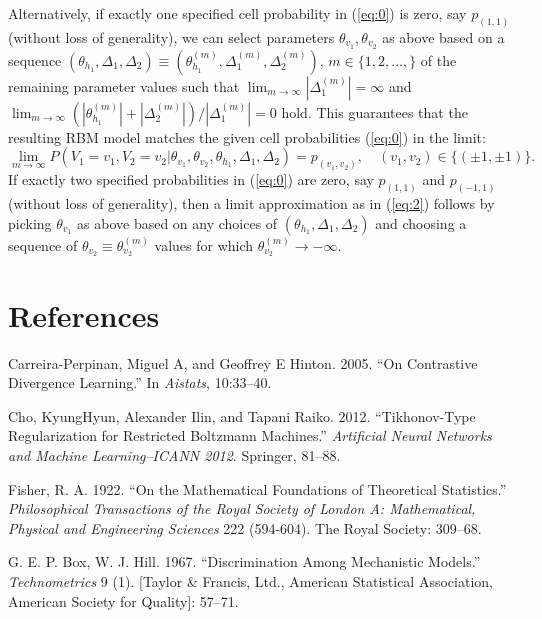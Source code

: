 \documentclass[12pt]{article}
\theoremstyle{definition}
\begin{document}
Alternatively, if exactly one specified cell probability in (\eqref{eq:0})
is zero, say \(p_{(1,1)}\) (without loss of generality), we can select
parameters \(\theta_{v_1},\theta_{v_2}\) as above based on a sequence
\((\theta_{h_1}, \Delta_{1}, \Delta_{2}) \equiv (\theta_{h_1}^{(m)}, \Delta_{1}^{(m)}, \Delta_{2}^{(m)})\),
\(m\in\{1,2,\ldots,\}\) of the remaining parameter values such that
\(\lim_{m\to \infty}|\Delta_{1}^{(m)}| = \infty\) and
\(\lim_{m\to \infty} (|\theta_{h_1}^{(m)}| + |\Delta_{2}^{(m)}|)/|\Delta_{1}^{(m)}|=0\)
hold. This guarantees that the resulting RBM model matches the given
cell probabilities (\eqref{eq:0}) in the limit:
\begin{equation}
\label{eq:2}
\lim_{m\to \infty}P(V_1=v_1,V_2=v_2| \theta_{v_1}, \theta_{v_2}, \theta_{h_1},\Delta_1,\Delta_2) = p_{(v_1,v_2)},\quad (v_1,v_2)\in\{(\pm 1,\pm 1)\}.
\end{equation}
If exactly two specified probabilities in (\eqref{eq:0}) are zero, say
\(p_{(1,1)}\) and \(p_{(-1,1)}\) (without loss of generality), then a
limit approximation as in (\eqref{eq:2}) follows by picking
\(\theta_{v_1}\) as above based on any choices of
\((\theta_{h_1}, \Delta_1,\Delta_2)\) and choosing a sequence of
\(\theta_{v_2}\equiv \theta_{v_2}^{(m)}\) values for which
\(\theta_{v_2}^{({m})} \rightarrow -\infty\).

\section*{References}\label{references}

\hypertarget{refs}{}
\hypertarget{ref-carreira2005contrastive}{}
Carreira-Perpinan, Miguel A, and Geoffrey E Hinton. 2005. ``On
Contrastive Divergence Learning.'' In \emph{Aistats}, 10:33--40.

\hypertarget{ref-cho2012tikhonov}{}
Cho, KyungHyun, Alexander Ilin, and Tapani Raiko. 2012. ``Tikhonov-Type
Regularization for Restricted Boltzmann Machines.'' \emph{Artificial
Neural Networks and Machine Learning--ICANN 2012}. Springer, 81--88.

\hypertarget{ref-fisher1922mathematical}{}
Fisher, R. A. 1922. ``On the Mathematical Foundations of Theoretical
Statistics.'' \emph{Philosophical Transactions of the Royal Society of
London A: Mathematical, Physical and Engineering Sciences} 222
(594-604). The Royal Society: 309--68.

\hypertarget{ref-box1967discrimination}{}
G. E. P. Box, W. J. Hill. 1967. ``Discrimination Among Mechanistic
Models.'' \emph{Technometrics} 9 (1). {[}Taylor \& Francis, Ltd.,
American Statistical Association, American Society for Quality{]}:
57--71.
\end{document}
